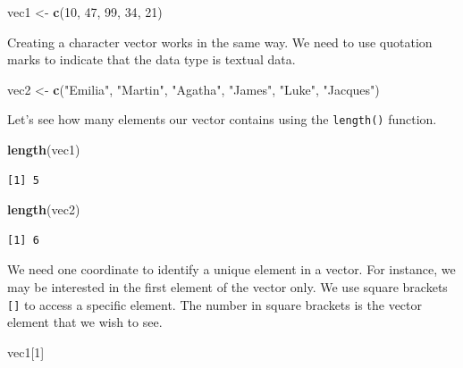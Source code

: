 \documentclass[]{article}
\newenvironment{Shaded}{\begin{snugshade}}{\end{snugshade}}
\newcommand{\DecValTok}[1]{\textcolor[rgb]{0.00,0.00,0.81}{#1}}
\newcommand{\KeywordTok}[1]{\textcolor[rgb]{0.13,0.29,0.53}{\textbf{#1}}}
\newcommand{\NormalTok}[1]{#1}
\newcommand{\StringTok}[1]{\textcolor[rgb]{0.31,0.60,0.02}{#1}}
\begin{document}
\begin{Shaded}
\begin{Highlighting}[]
\NormalTok{vec1 <-}\StringTok{ }\KeywordTok{c}\NormalTok{(}\DecValTok{10}\NormalTok{, }\DecValTok{47}\NormalTok{, }\DecValTok{99}\NormalTok{, }\DecValTok{34}\NormalTok{, }\DecValTok{21}\NormalTok{)}
\end{Highlighting}
\end{Shaded}

Creating a character vector works in the same way. We need to use quotation marks to indicate that the data type is textual data.

\begin{Shaded}
\begin{Highlighting}[]
\NormalTok{vec2 <-}\StringTok{ }\KeywordTok{c}\NormalTok{(}\StringTok{"Emilia"}\NormalTok{, }\StringTok{"Martin"}\NormalTok{, }\StringTok{"Agatha"}\NormalTok{, }\StringTok{"James"}\NormalTok{, }\StringTok{"Luke"}\NormalTok{, }\StringTok{"Jacques"}\NormalTok{)}
\end{Highlighting}
\end{Shaded}

Let's see how many elements our vector contains using the \texttt{length()} function.

\begin{Shaded}
\begin{Highlighting}[]
\KeywordTok{length}\NormalTok{(vec1)}
\end{Highlighting}
\end{Shaded}

\begin{verbatim}
[1] 5
\end{verbatim}

\begin{Shaded}
\begin{Highlighting}[]
\KeywordTok{length}\NormalTok{(vec2)}
\end{Highlighting}
\end{Shaded}

\begin{verbatim}
[1] 6
\end{verbatim}

We need one coordinate to identify a unique element in a vector. For instance, we may be interested in the first element of the vector only. We use square brackets \texttt{{[}{]}} to access a specific element. The number in square brackets is the vector element that we wish to see.

\begin{Shaded}
\begin{Highlighting}[]
\NormalTok{vec1[}\DecValTok{1}\NormalTok{]}
\end{Highlighting}
\end{Shaded}
\end{document}
